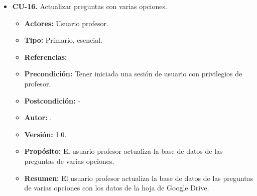 \begin{itemize}
  \item \textbf{CU-16.} Actualizar preguntas con varias opciones.
  \begin{itemize}
    \item \textbf{Actores:} Usuario profesor.
    \item \textbf{Tipo:} Primario, esencial.
    \item \textbf{Referencias:}
    \item \textbf{Precondición:} Tener iniciada una sesión de usuario con privilegios de profesor.
    \item \textbf{Postcondición:} - 
    \item \textbf{Autor:} \autor.
    \item \textbf{Versión:} 1.0.
    \item \textbf{Propósito:} El usuario profesor actualiza la base de datos de las preguntas de varias opciones.
    \item \textbf{Resumen:} El usuario profesor actualiza la base de datos de las preguntas de varias opciones con los datos de la hoja de Google Drive.


\end{itemize}
\end{itemize}
